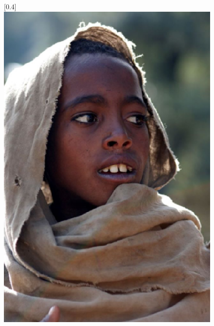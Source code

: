 \documentclass[11pt, a4paper]{article}
\begin{document}
\begin{figure}[h]
    \centering
    \scalebox{0.4}[0.4]{\includegraphics{etiopan.eps}} 

\end{figure}
\end{document}
